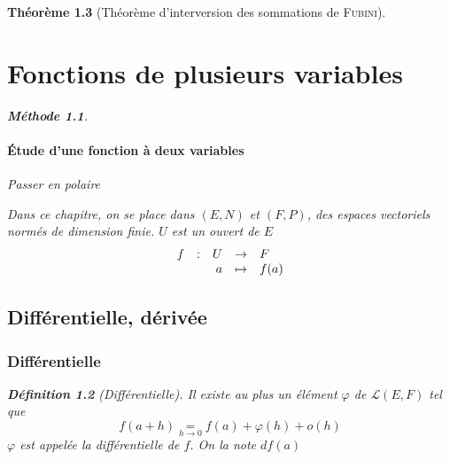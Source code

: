 \documentclass[11pt,a4paper]{report}
\newtheorem{theorem}{Théorème}[chapter]
\theoremstyle{definition}
\newtheorem{dfn}[theorem]{Définition}
\newtheorem{methode}[theorem]{Méthode}
\begin{document}
\begin{theorem}[Théorème d'interversion des sommations de \textsc{Fubini}]
{{%



\chapter{Fonctions de plusieurs variables}
\begin{methode}
\subsubsection*{Étude d'une fonction à deux variables} \newline
Passer en polaire
\end{methode}


Dans ce chapitre, on se place dans $\left( E, N \right)$ et $\left( F,P \right)$, des espaces vectoriels normés de dimension finie. $U$ est un ouvert de $E$
\[
    \begin{array}{r c r c l}
    f&:& U &\to & F \\
     & & a &\mapsto & f(a)
    \end{array}
\]

\section{Différentielle, dérivée}
\subsection{Différentielle}
\begin{dfn}[Différentielle]
Il existe \emph{au plus} un élément $\varphi$ de $\mathscr{L}(E,F)$ tel que
\[
    f(a+h) \underset{h\to 0}{=} f(a) + \varphi(h) + o(h)
\]
$\varphi$ est appelée la \emph{différentielle} de $f$. On la note $df(a)$
\end{dfn}

}}
\end{theorem}
\end{document}
